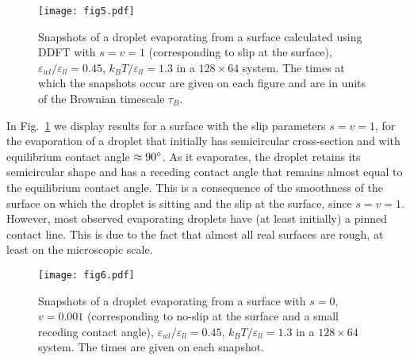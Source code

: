 \documentclass[journal=langd5,manuscript=article]{achemso}
\def\e{\varepsilon}
\begin{document}
\begin{figure}[t]
\texttt{[image: fig5.pdf]}
\caption{%
  Snapshots of a droplet evaporating from a surface calculated using
  DDFT with $s=v=1$ (corresponding to slip at the surface),
  $\e_{wl}/\e_{ll}=0.45$, $k_BT/\e_{ll} = 1.3$ in a $128 \times 64$
  system. The times at which the snapshots occur are given on each
  figure and are in units of the Brownian timescale $\tau_B$.
}
\label{fig:liquid-smooth-evap}
\end{figure}

In Fig.~\ref{fig:liquid-smooth-evap} we display results for a surface with the slip parameters $s=v=1$, for the evaporation of a droplet that initially has semicircular cross-section and with equilibrium contact angle $\approx 90\degree$. As it evaporates, the droplet 
retains its semicircular shape and has a receding contact angle that remains almost equal to the equilibrium contact angle. This is a consequence of the smoothness of the surface on which the droplet is sitting and the slip at the surface, since $s=v=1$.
However, most observed evaporating droplets have (at least initially) a pinned contact line. This is due to the fact that almost
all real surfaces are rough, at least on the microscopic scale.

\begin{figure}
\texttt{[image: fig6.pdf]}
\caption{%
  Snapshots of a droplet evaporating from a surface
  with $s=0$, $v=0.001$ (corresponding to no-slip at the surface and a
  small receding contact angle), $\e_{wl}/\e_{ll}=0.45$, $k_BT/\e_{ll}
  = 1.3$ in a $128 \times 64$ system. The times are given on each snapshot.
}
\label{fig:liquid-evap}
\end{figure}
\end{document}
